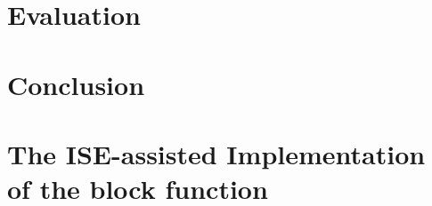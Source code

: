 \documentclass[preprint]{iacrtrans}
\begin{document}
\section{Evaluation}
\label{sec:res}


\section{Conclusion}
\label{sec:outro}







\appendix

\newpage
\section{The ISE-assisted Implementation of the block function}
\label{appx:ISE-assisted Implementation}
\lstset{style=mystyle}

\end{document}
